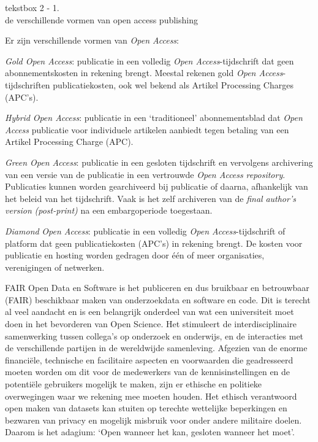 \documentclass{jote-book}
\begin{document}
	\begin{bookbox}{\raggedright tekstbox 2 - 1. \\de verschillende vormen van open access publishing}
		Er zijn verschillende vormen van \emph{Open Access}:

		\vspace*{\baselineskip}

		\emph{Gold Open Access}: publicatie in een volledig \emph{Open Access}-tijdschrift dat geen abonnementskosten in rekening brengt. Meestal rekenen gold \emph{Open Access}-tijdschriften publicatiekosten, ook wel bekend als Artikel Processing Charges (APC's).

		\vspace*{\baselineskip}

		\emph{Hybrid}\emph{ Open Access}: publicatie in een ‘traditioneel' abonnementsblad dat \emph{Open Access} publicatie voor individuele artikelen aanbiedt tegen betaling van een Artikel Processing Charge (APC).

		\vspace*{\baselineskip}

		\emph{Green Open Access}: publicatie in een gesloten tijdschrift en vervolgens archivering van een versie van de publicatie in een vertrouwde \emph{Open Access} \emph{repository}. Publicaties kunnen worden gearchiveerd bij publicatie of daarna, afhankelijk van het beleid van het tijdschrift. Vaak is het zelf archiveren van de\emph{ }\emph{final}\emph{ }\emph{author's}\emph{ }\emph{version}\emph{ (post-print)} na een embargoperiode toegestaan.

		\vspace*{\baselineskip}

		\emph{Diamond}\emph{ Open Access}: publicatie in een volledig \emph{Open Access}-tijdschrift of platform dat geen publicatiekosten (APC's) in rekening brengt. De kosten voor publicatie en hosting worden gedragen door één of meer organisaties, verenigingen of netwerken.
	\end{bookbox}

	FAIR Open Data en Software is het publiceren en dus bruikbaar en betrouwbaar (FAIR) beschikbaar maken van onderzoekdata en software en code. Dit is terecht al veel aandacht en is een belangrijk onderdeel van wat een universiteit moet doen in het bevorderen van Open Science. Het stimuleert de interdisciplinaire samenwerking tussen collega's op onderzoek en onderwijs, en de interacties met de verschillende partijen in de wereldwijde samenleving. Afgezien van de enorme financiële, technische en facilitaire aspecten en voorwaarden die geadresseerd moeten worden om dit voor de medewerkers van de kennisinstellingen en de potentiële gebruikers mogelijk te maken, zijn er ethische en politieke overwegingen waar we rekening mee moeten houden. Het ethisch verantwoord open maken van datasets kan stuiten op terechte wettelijke beperkingen en bezwaren van privacy en mogelijk misbruik voor onder andere militaire doelen. Daarom is het adagium: ‘Open wanneer het kan, gesloten wanneer het moet'.
\end{document}
